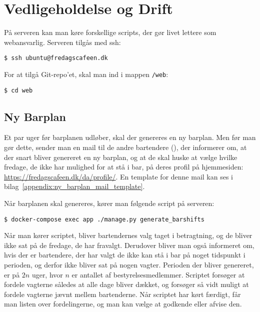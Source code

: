\section{Vedligeholdelse og Drift}
\label{sec:vedligeholdelse-og-drift}

På serveren kan man køre forskellige scripts, der gør livet lettere som webansvarlig.
Serveren tilgås med ssh:

\begin{verbatim}
$ ssh ubuntu@fredagscafeen.dk
\end{verbatim}

For at tilgå Git-repo'et, skal man ind i mappen \texttt{/web}:

\begin{verbatim}
$ cd web
\end{verbatim}

\subsection{Ny Barplan}
\label{sec:ny-barplan}

Et par uger før barplanen udløber, skal der genereres en ny barplan.
Men før man gør dette, sender man en mail til de andre bartendere (), 
der informerer om, at der snart bliver genereret en ny barplan, og at de skal huske at vælge hvilke 
fredage, de ikke har mulighed for at stå i bar, på deres profil på hjemmesiden: 
\url{https://fredagscafeen.dk/da/profile/}. 
En template for denne mail kan ses i bilag~\ref{appendix:ny_barplan_mail_template}.

Når barplanen skal genereres, kører man følgende script på serveren:

\begin{verbatim}
$ docker-compose exec app ./manage.py generate_barshifts
\end{verbatim}

Når man kører scriptet, bliver bartendernes valg taget i betragtning, og de bliver ikke sat på de
fredage, de har fravalgt. Derudover bliver man også informeret om, hvis der er bartendere, der har
valgt de ikke kan stå i bar på noget tidspunkt i perioden, og derfor ikke bliver sat på nogen vagter.
Perioden der bliver genereret, er på $2n$ uger, hvor $n$ er antallet af bestyrelsesmedlemmer.
Scriptet forsøger at fordele vagterne således at alle dage bliver dækket, og forsøger så vidt muligt
at fordele vagterne jævnt mellem bartenderne.
Når scriptet har kørt færdigt, får man listen over fordelingerne, og man kan vælge at godkende eller
afvise den.

